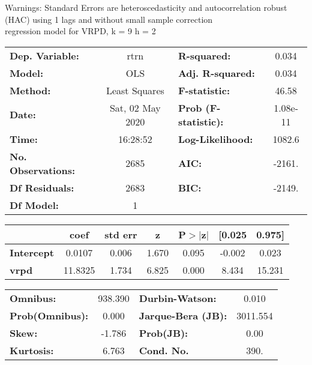 Warnings: \newline
 [1] Standard Errors are heteroscedasticity and autocorrelation robust (HAC) using 1 lags and without small sample correction\\ 

regression model for VRPD, k = 9 h = 2\begin{center}
\begin{tabular}{lclc}
\toprule
\textbf{Dep. Variable:}    &       rtrn       & \textbf{  R-squared:         } &     0.034   \\
\textbf{Model:}            &       OLS        & \textbf{  Adj. R-squared:    } &     0.034   \\
\textbf{Method:}           &  Least Squares   & \textbf{  F-statistic:       } &     46.58   \\
\textbf{Date:}             & Sat, 02 May 2020 & \textbf{  Prob (F-statistic):} &  1.08e-11   \\
\textbf{Time:}             &     16:28:52     & \textbf{  Log-Likelihood:    } &    1082.6   \\
\textbf{No. Observations:} &        2685      & \textbf{  AIC:               } &    -2161.   \\
\textbf{Df Residuals:}     &        2683      & \textbf{  BIC:               } &    -2149.   \\
\textbf{Df Model:}         &           1      & \textbf{                     } &             \\
\bottomrule
\end{tabular}
\begin{tabular}{lcccccc}
                   & \textbf{coef} & \textbf{std err} & \textbf{z} & \textbf{P$> |$z$|$} & \textbf{[0.025} & \textbf{0.975]}  \\
\midrule
\textbf{Intercept} &       0.0107  &        0.006     &     1.670  &         0.095        &       -0.002    &        0.023     \\
\textbf{vrpd}      &      11.8325  &        1.734     &     6.825  &         0.000        &        8.434    &       15.231     \\
\bottomrule
\end{tabular}
\begin{tabular}{lclc}
\textbf{Omnibus:}       & 938.390 & \textbf{  Durbin-Watson:     } &    0.010  \\
\textbf{Prob(Omnibus):} &   0.000 & \textbf{  Jarque-Bera (JB):  } & 3011.554  \\
\textbf{Skew:}          &  -1.786 & \textbf{  Prob(JB):          } &     0.00  \\
\textbf{Kurtosis:}      &   6.763 & \textbf{  Cond. No.          } &     390.  \\
\bottomrule
\end{tabular}
\end{center}

